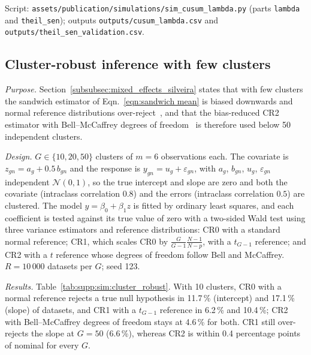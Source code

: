 \noindent Script: \texttt{assets/publication/simulations/sim\_cusum\_lambda.py} (parts \texttt{lambda} and \texttt{theil\_sen}); outputs \texttt{outputs/cusum\_lambda.csv} and \texttt{outputs/theil\_sen\_validation.csv}.

\subsection{Cluster-robust inference with few clusters}
\label{supp:sim:cluster_robust}

\textit{Purpose.} Section~\ref{subsubsec:mixed_effects_silveira} states that with few clusters the sandwich estimator of Eqn.~\ref{eqn:sandwich mean} is biased downwards and normal reference distributions over-reject~\cite{Cameron2008,Cameron2015}, and that the bias-reduced CR2 estimator with Bell--McCaffrey degrees of freedom~\cite{BellMcCaffrey2002,Imbens2016} is therefore used below 50 independent clusters.

\textit{Design.} $G \in \{10, 20, 50\}$ clusters of $m = 6$ observations each. The covariate is $z_{gn} = a_g + 0.5\,b_{gn}$ and the response is $y_{gn} = u_g + \varepsilon_{gn}$, with $a_g$, $b_{gn}$, $u_g$, $\varepsilon_{gn}$ independent $\mathcal{N}(0,1)$, so the true intercept and slope are zero and both the covariate (intraclass correlation $0.8$) and the errors (intraclass correlation $0.5$) are clustered. The model $y = \beta_0 + \beta_1 z$ is fitted by ordinary least squares, and each coefficient is tested against its true value of zero with a two-sided Wald test using three variance estimators and reference distributions: CR0 with a standard normal reference; CR1, which scales CR0 by $\tfrac{G}{G-1}\tfrac{N-1}{N-p}$, with a $t_{G-1}$ reference; and CR2 with a $t$ reference whose degrees of freedom follow Bell and McCaffrey. $R = 10\,000$ datasets per $G$; seed 123.

\textit{Results.} Table~\ref{tab:supp:sim:cluster_robust}. With 10 clusters, CR0 with a normal reference rejects a true null hypothesis in 11.7\,\% (intercept) and 17.1\,\% (slope) of datasets, and CR1 with a $t_{G-1}$ reference in 6.2\,\% and 10.4\,\%; CR2 with Bell--McCaffrey degrees of freedom stays at 4.6\,\% for both. CR1 still over-rejects the slope at $G = 50$ (6.6\,\%), whereas CR2 is within 0.4 percentage points of nominal for every $G$.

